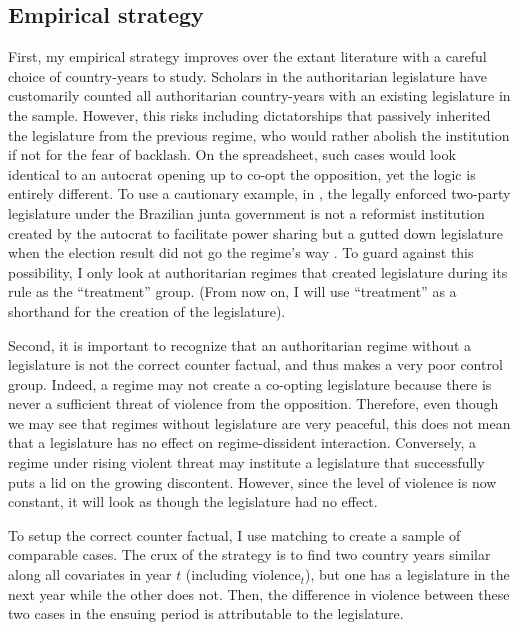 \subsection{Empirical strategy}

First, my empirical strategy improves over the extant literature with a careful choice of country-years to study. Scholars in the authoritarian legislature have customarily counted all authoritarian country-years with an existing legislature in the sample. However, this risks including dictatorships that passively inherited the legislature from the previous regime, who would rather abolish the institution if not for the fear of backlash. On the spreadsheet, such cases would look identical to an autocrat opening up to co-opt the opposition, yet the logic is entirely different. To use a cautionary example, in \citet[1283]{Gandhi2007}, the legally enforced two-party legislature under the Brazilian junta government is not a reformist institution created by the autocrat to facilitate power sharing but a gutted down legislature when the election result did not go the regime's way \citep{Stepan1976}. To guard against this possibility, I only look at authoritarian regimes that created  legislature during its rule as the ``treatment'' group. (From now on, I will use ``treatment'' as a shorthand for the creation of the legislature).

Second, it is important to recognize that an authoritarian regime without a legislature is not the correct counter factual, and thus makes a very poor control group. Indeed, a regime may not create a co-opting legislature because there is never a sufficient threat of violence from the opposition. Therefore, even though we may see that regimes without legislature are very peaceful, this does not mean that a legislature has no effect on regime-dissident interaction. Conversely, a regime under rising violent threat may institute a legislature that successfully puts a lid on the growing discontent. However, since the level of violence is now constant, it will look as though the legislature had no effect.

To setup the correct counter factual, I use matching to create a sample of comparable cases. The crux of the strategy is to find two country years similar along all covariates in year $t$ (including $\text{violence}_t$), but one has a legislature in the next year while the other does not. Then, the difference in violence between these two cases in the ensuing period is attributable to the legislature.


